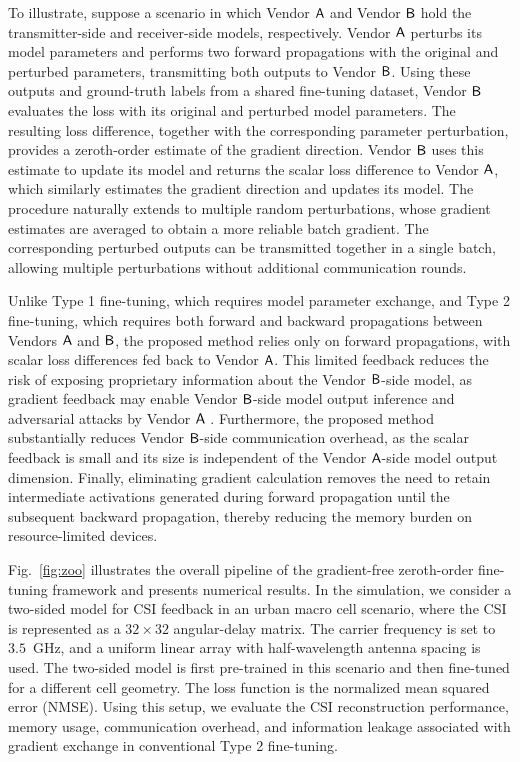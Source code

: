 \documentclass[10pt,twocolumn]{IEEEtran}
\begin{document}
To illustrate, suppose a scenario in which Vendor ${\sf A}$ and Vendor ${\sf B}$ hold the transmitter-side and receiver-side models, respectively. Vendor ${\sf A}$ perturbs its model parameters and performs two forward propagations with the original and perturbed parameters, transmitting both outputs to Vendor ${\sf B}$. Using these outputs and ground-truth labels from a shared fine-tuning dataset, Vendor ${\sf B}$ evaluates the loss with its original and perturbed model parameters. The resulting loss difference, together with the corresponding parameter perturbation, provides a zeroth-order estimate of the gradient direction. Vendor ${\sf B}$ uses this estimate to update its model and returns the scalar loss difference to Vendor ${\sf A}$, which similarly estimates the gradient direction and updates its model. The procedure naturally extends to multiple random perturbations, whose gradient estimates are averaged to obtain a more reliable batch gradient. The corresponding perturbed outputs can be transmitted together in a single batch, allowing multiple perturbations without additional communication rounds.

Unlike Type 1 fine-tuning, which requires model parameter exchange, and Type 2 fine-tuning, which requires both forward and backward propagations between Vendors ${\sf A}$ and ${\sf B}$, the proposed method relies only on forward propagations, with scalar loss differences fed back to Vendor ${\sf A}$. This limited feedback reduces the risk of exposing proprietary information about the Vendor ${\sf B}$-side model, as gradient feedback may enable Vendor ${\sf B}$-side model output inference and adversarial attacks by Vendor ${\sf A}$ \cite{papernot2016limitations}. Furthermore, the proposed method substantially reduces Vendor ${\sf B}$-side communication overhead, as the scalar feedback is small and its size is independent of the Vendor ${\sf A}$-side model output dimension. Finally, eliminating gradient calculation removes the need to retain intermediate activations generated during forward propagation until the subsequent backward propagation, thereby reducing the memory burden on resource-limited devices.

Fig.~\ref{fig:zoo} illustrates the overall pipeline of the gradient-free zeroth-order fine-tuning framework and presents numerical results. In the simulation, we consider a two-sided model for CSI feedback in an urban macro cell scenario, where the CSI is represented as a $32 \times 32$ angular-delay matrix. The carrier frequency is set to $3.5$~GHz, and a uniform linear array with half-wavelength antenna spacing is used. %
The two-sided model is first pre-trained in this scenario and then fine-tuned for a different cell geometry. The loss function is the normalized mean squared error (NMSE). Using this setup, we evaluate the CSI reconstruction performance, memory usage, communication overhead, and information leakage associated with gradient exchange in conventional Type 2 fine-tuning. 
\end{document}

